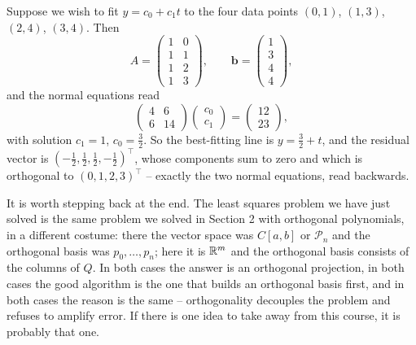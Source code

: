 \documentclass[a4paper]{scrartcl}
\newcommand{\Pn}[1]{\mathcal{P}_{#1}}
\begin{document}
\begin{example}
  Suppose we wish to fit $y = c_0 + c_1t$ to the four data points $(0,1)$, $(1,3)$, $(2,4)$, $(3,4)$. Then
  $$
  A = \begin{pmatrix}1&0\\1&1\\1&2\\1&3\end{pmatrix}, \qquad \mathbf b = \begin{pmatrix}1\\3\\4\\4\end{pmatrix},
  $$
  and the normal equations read
  $$
  \begin{pmatrix}4&6\\6&14\end{pmatrix}\begin{pmatrix}c_0\\c_1\end{pmatrix} = \begin{pmatrix}12\\23\end{pmatrix},
  $$
  with solution $c_1 = 1$, $c_0 = \tfrac32$. So the best-fitting line is $y = \tfrac32 + t$, and the residual vector is $\left(-\tfrac12, \tfrac12, \tfrac12, -\tfrac12\right)^\top$, whose components sum to zero and which is orthogonal to $(0,1,2,3)^\top$ -- exactly the two normal equations, read backwards.
\end{example}

\begin{remark}
  It is worth stepping back at the end. The least squares problem we have just solved is the same problem we solved in Section 2 with orthogonal polynomials, in a different costume: there the vector space was $C[a,b]$ or $\Pn{n}$ and the orthogonal basis was $p_0, \dots, p_n$; here it is $\mathbb{R}^m$ and the orthogonal basis consists of the columns of $Q$. In both cases the answer is an orthogonal projection, in both cases the good algorithm is the one that builds an orthogonal basis first, and in both cases the reason is the same -- orthogonality decouples the problem and refuses to amplify error. If there is one idea to take away from this course, it is probably that one.
\end{remark}
\end{document}
